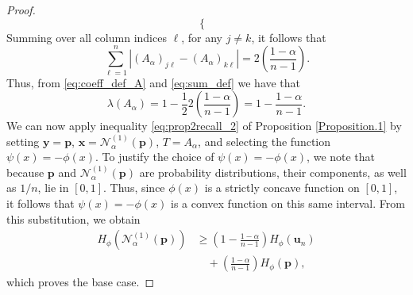 \documentclass[pdflatex,sn-basic,iicol]{sn-jnl}%
\theoremstyle{thmstyleone}%
\theoremstyle{thmstyletwo}%
\theoremstyle{thmstylethree}%
\newcommand{\N}{\mathcal{N}}
\newcommand{\bp}{\mathbf{p}}
\newcommand{\bu}{\mathbf{u}}
\newcommand{\x}{\mathbf{x}}
\newcommand{\y}{\mathbf{y}}
\begin{document}
\begin{proof}
{\begin{equation}
\begin{cases}
        \end{cases}
    \end{equation}
    Summing over all column indices $\ell$, for any $j\neq k$, it follows that
    \begin{equation}\label{eq:sum_def}
        \sum_{\ell=1}^n|(A_\alpha)_{j\ell}-(A_\alpha)_{k\ell}| = 2\left(\frac{1-\alpha}{n-1}\right).
    \end{equation}
    Thus, from \eqref{eq:coeff_def_A} and \eqref{eq:sum_def} we have that
    \begin{equation}
        \lambda(A_\alpha)=1-\frac{1}{2}2\left(\frac{1-\alpha}{n-1}\right)=1-\frac{1-\alpha}{n-1}.
    \end{equation}
    We can now apply inequality \eqref{eq:prop2recall_2} of Proposition \ref{Proposition.1} by setting $\y=\bp$, $\x=\N_\alpha^{(1)}(\bp)$, $T=A_\alpha$, and selecting the function $\psi(x)=-\phi(x)$. To justify the choice of $\psi(x)=-\phi(x)$, we note that because $\bp$ and $\N_\alpha^{(1)}(\bp)$ are probability distributions, their components, as well as $1/n$, lie in $[0,1]$. Thus, since $\phi(x)$ is a strictly concave function on $[0,1]$, it follows that $\psi(x)=-\phi(x)$ is a convex function on this same interval. From this substitution, we obtain
    \begin{align*}
    H_\phi(\N_\alpha^{(1)}(\bp)) &\geq \left(1-\frac{1-\alpha}{n-1}\right)H_\phi(\bu_n)\\&\quad+\left(\frac{1-\alpha}{n-1}\right) H_\phi(\bp),
    \end{align*}
    which proves the base case.

}
\end{proof}
\end{document}
